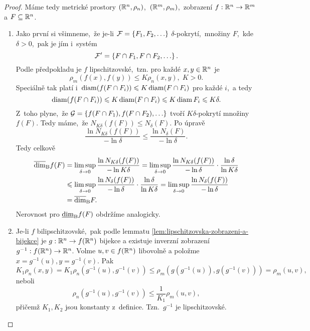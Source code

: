 \begin{proof}
    Máme tedy metrické prostory $(\mathbb{R}^n,\rho_n)$,~$(\mathbb{R}^m,\rho_m)$,~zobrazení $f:\mathbb{R}^n \rightarrow \mathbb{R}^m$ a $F\subseteq\mathbb{R}^n$.
    \begin{enumerate}[label=\textit{(\roman*)}]
        \item Jako první si všimneme,~že je-li $\mathcal{F}=\left\{F_1,F_2,\ldots\right\}$ $\delta$-pokrytí,~množiny $F$,~kde $\delta>0$,~pak je jím i~systém
        \[\mathcal{F}^\prime=\left\{F\cap F_1,F\cap F_2,\ldots\right\}.\]
        Podle předpokladu je $f$ lipschitzovské,~tzn. pro každé $x,y\in\mathbb{R}^n$ je
        \[\rho_m(f(x),f(y))\leqslant K\rho_n(x,y),\;K>0.\]
        Speciálně tak platí i~$\operatorname{diam}(f(F\cap F_i))\leqslant K\operatorname{diam}(F\cap F_i)$ pro každé $i$,~a tedy
        \[\operatorname{diam}(f(F\cap F_i))\leqslant K\operatorname{diam}(F\cap F_i)\leqslant K\operatorname{diam}{F_i}\leqslant K\delta.\]
        Z~toho plyne,~že $\mathcal{G}=\left\{f(F\cap F_1),f(F\cap F_2),\ldots\right\}$ tvoří $K\delta$-pokrytí množiny $f(F)$. Tedy máme,~že $N_{K\delta}(f(F))\leqslant N_\delta(F)$. Po úpravě
        \[\dfrac{\ln{N_{K\delta}(f(F))}}{-\ln{\delta}}\leqslant\dfrac{\ln{N_\delta(F)}}{-\ln{\delta}}.\]
        Tedy celkově
        \begin{align*}
            \overline{\dim}_\textup{B}{f(F)}&=\limsup_{\delta\to 0}\dfrac{\ln{N_{K\delta}(f(F))}}{-\ln{K\delta}}=\limsup_{\delta\to 0}\dfrac{\ln{N_{K\delta}(f(F))}}{-\ln{\delta}}\cdot\dfrac{\ln{\delta}}{\ln{K\delta}}\\
            &\leqslant\limsup_{\delta\to 0}\dfrac{\ln{N_{\delta}(f(F))}}{-\ln{\delta}}\cdot\dfrac{\ln{\delta}}{\ln{K\delta}}=\limsup_{\delta\to 0}\dfrac{\ln{N_{\delta}(f(F))}}{-\ln{\delta}}\\
            &=\overline{\dim}_\textup{B}{F}.
        \end{align*}
        Nerovnost pro $\underline{\dim}_\textup{B}{f(F)}$ obdržíme analogicky.
        \item Je-li $f$ bilipschitzovské,~pak podle lemmatu \ref{lem:lipschitzovska-zobrazeni-a-bijekce} je $g:\mathbb{R}^n \rightarrow f(\mathbb{R}^n)$ bijekce a existuje inverzní zobrazení $g^{-1}:f(\mathbb{R}^n) \rightarrow \mathbb{R}^n$. Volme $u,v\in f(\mathbb{R}^n)$ libovolně a položme $x=g^{-1}(u),y=g^{-1}(v)$. Pak
        \[K_1\rho_n(x,y)=K_1\rho_n(g^{-1}(u),g^{-1}(v))\leqslant\rho_m(g(g^{-1}(u)),g(g^{-1}(v)))=\rho_m(u,v),\]
        neboli
        \[\rho_n(g^{-1}(u),g^{-1}(v))\leqslant\dfrac{1}{K_1}\rho_m(u,v),\]
        přičemž $K_1,K_2$ jsou konstanty z~definice. Tzn.~$g^{-1}$ je lipschitzovské.


\end{enumerate}
\end{proof}
